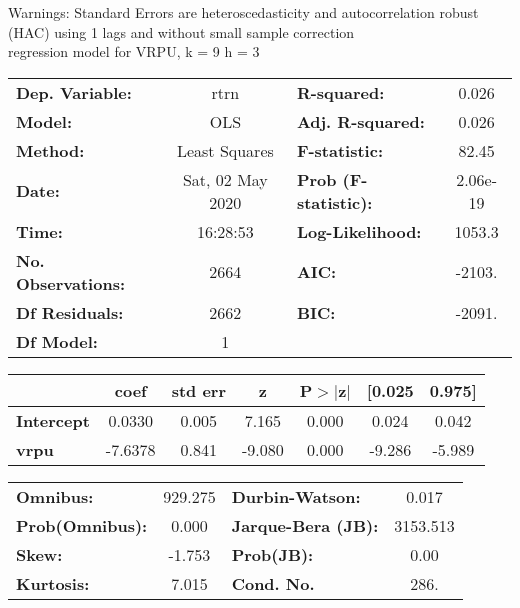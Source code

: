 Warnings: \newline
 [1] Standard Errors are heteroscedasticity and autocorrelation robust (HAC) using 1 lags and without small sample correction\\ 

regression model for VRPU, k = 9 h = 3\begin{center}
\begin{tabular}{lclc}
\toprule
\textbf{Dep. Variable:}    &       rtrn       & \textbf{  R-squared:         } &     0.026   \\
\textbf{Model:}            &       OLS        & \textbf{  Adj. R-squared:    } &     0.026   \\
\textbf{Method:}           &  Least Squares   & \textbf{  F-statistic:       } &     82.45   \\
\textbf{Date:}             & Sat, 02 May 2020 & \textbf{  Prob (F-statistic):} &  2.06e-19   \\
\textbf{Time:}             &     16:28:53     & \textbf{  Log-Likelihood:    } &    1053.3   \\
\textbf{No. Observations:} &        2664      & \textbf{  AIC:               } &    -2103.   \\
\textbf{Df Residuals:}     &        2662      & \textbf{  BIC:               } &    -2091.   \\
\textbf{Df Model:}         &           1      & \textbf{                     } &             \\
\bottomrule
\end{tabular}
\begin{tabular}{lcccccc}
                   & \textbf{coef} & \textbf{std err} & \textbf{z} & \textbf{P$> |$z$|$} & \textbf{[0.025} & \textbf{0.975]}  \\
\midrule
\textbf{Intercept} &       0.0330  &        0.005     &     7.165  &         0.000        &        0.024    &        0.042     \\
\textbf{vrpu}      &      -7.6378  &        0.841     &    -9.080  &         0.000        &       -9.286    &       -5.989     \\
\bottomrule
\end{tabular}
\begin{tabular}{lclc}
\textbf{Omnibus:}       & 929.275 & \textbf{  Durbin-Watson:     } &    0.017  \\
\textbf{Prob(Omnibus):} &   0.000 & \textbf{  Jarque-Bera (JB):  } & 3153.513  \\
\textbf{Skew:}          &  -1.753 & \textbf{  Prob(JB):          } &     0.00  \\
\textbf{Kurtosis:}      &   7.015 & \textbf{  Cond. No.          } &     286.  \\
\bottomrule
\end{tabular}
\end{center}

